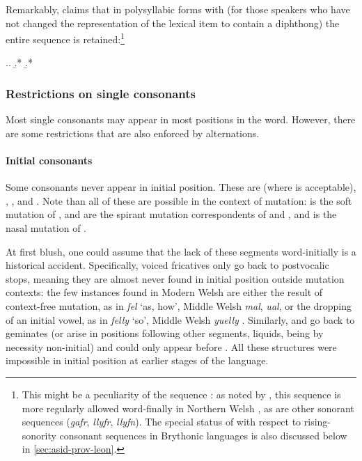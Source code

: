 Remarkably, \citet{awbery86:_pembr_welsh} claims that in polysyllabic forms with \ipa{[v]} (\ie for those speakers who have not changed the representation of the lexical item to contain a diphthong) the entire sequence is retained:\footnote{This might be a peculiarity of the sequence \ipa{[vn]}: as noted by \citet{hannahs09:_welsh}, this sequence is more regularly allowed word-finally in Northern Welsh \citep[\egm][\emph{s.\,vv.\@} \emph{cefn}, \emph{cafn}, \emph{ofn}, \emph{dwfn}]{thomas00:_welsh}, as are other \ipa{[v]}\endash sonorant sequences (\emph{gafr}, \emph{llyfr}, \emph{llyfn}). The special status of \ipa{[v]} with respect to rising\hyp sonority consonant sequences in Brythonic languages is also discussed below in \cref{sec:asid-prov-leon}.}

\ex.\a.
\b.*\mbi{[ˈəskav]}
\b.*\mbi{[ˈəskan]}

\subsubsection{Restrictions on single consonants}
\label{sec:restr-single-cons}

Most single consonants may appear in most positions in the word. However, there are some restrictions that are also enforced by alternations.

\paragraph{Initial consonants}
\label{sec:initial-consonants}

Some consonants never appear in initial position. These are \ipa{[ð]} (where \ipa{[v]} is acceptable), \ipa{[θ]}, \ipa{[χ]}, and \ipa{[ŋ]}. Note than all of these are possible in the context of mutation: \ipa{[ð]} is the soft mutation of \ipa{[d]}, \ipa{[θ]} and \ipa{[χ]} are the spirant mutation correspondents of \ipa{[t]} and \ipa{[k]}, and \ipa{[ŋ]} is the nasal mutation of \ipa{[ɡ]}.

At first blush, one could assume that the lack of these segments word\hyp initially is a historical accident. Specifically, voiced fricatives only go back to postvocalic stops, meaning they are almost never found in initial position outside mutation contexts: the few instances found in Modern Welsh are either the result of context-free mutation, as in \emph{fel} `as, how', Middle Welsh \emph{mal}, \emph{ual}, or the dropping of an initial vowel, as in \emph{felly} `so', Middle Welsh \emph{yuelly} \citep{wg-mj,simonevans}. Similarly, \ipa{[θ]} and \ipa{[χ]} go back to geminates (or arise in positions following other segments, \eg liquids, being by necessity non\hyp initial) and \ipa{[ŋ]} could only appear before \ipa{[ɡ]}. All these structures were impossible in initial position at earlier stages of the language.

